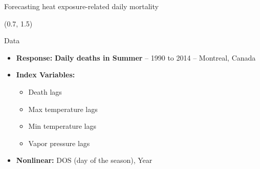 \documentclass[
  12pt,
  ignorenonframetext,
  aspectratio=169,
]{beamer}
\begin{document}
\begin{frame}{Forecasting heat exposure-related daily mortality}
\label{forecasting-heat-exposure-related-daily-mortality-1}
\begin{textblock}{7}(0.7, 1.5)
\fontsize{11}{12}\sf
\begin{block}{Data}
  \begin{itemize}
    \item \color{violet} \textbf{Response:} \color{black} \textbf{Daily deaths in Summer} -- 1990 to 2014 -- Montreal, Canada
    \item \color{violet} \textbf{Index Variables:} 
      \begin{itemize}
        \item \color{black} Death lags
        \item \color{black} Max temperature lags
        \item \color{black} Min temperature lags
        \item \color{black} Vapor pressure lags
      \end{itemize}
    \item \color{violet}\textbf{Nonlinear:} \color{black} DOS (day of the season), Year \newline
  \end{itemize}
\end{block}
\end{textblock}
\end{frame}
\end{document}
